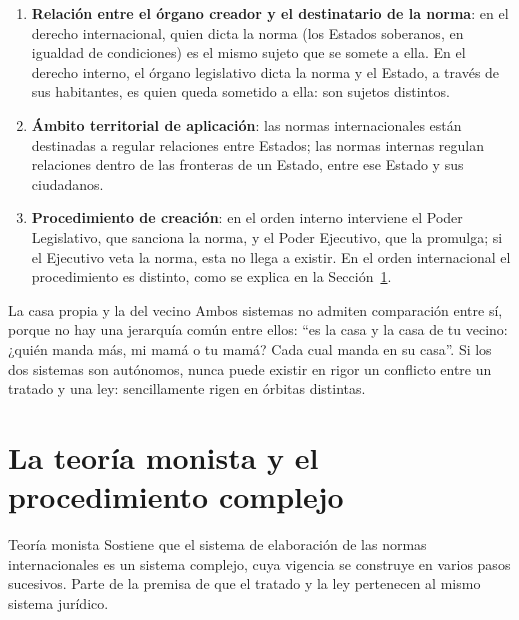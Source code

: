 \documentclass[12pt,oneside]{book}
\begin{document}
\begin{enumerate}
    \item \textbf{Relación entre el órgano creador y el destinatario de la norma}: en el derecho internacional, quien dicta la norma (los Estados soberanos, en igualdad de condiciones) es el mismo sujeto que se somete a ella. En el derecho interno, el órgano legislativo dicta la norma y el Estado, a través de sus habitantes, es quien queda sometido a ella: son sujetos distintos.
    \item \textbf{Ámbito territorial de aplicación}: las normas internacionales están destinadas a regular relaciones entre Estados; las normas internas regulan relaciones dentro de las fronteras de un Estado, entre ese Estado y sus ciudadanos.
    \item \textbf{Procedimiento de creación}: en el orden interno interviene el Poder Legislativo, que sanciona la norma, y el Poder Ejecutivo, que la promulga; si el Ejecutivo veta la norma, esta no llega a existir. En el orden internacional el procedimiento es distinto, como se explica en la Sección~\ref{sec:monismo}.
\end{enumerate}

\begin{example}{La casa propia y la del vecino}
Ambos sistemas no admiten comparación entre sí, porque no hay una jerarquía común entre ellos: “es la casa y la casa de tu vecino: ¿quién manda más, mi mamá o tu mamá? Cada cual manda en su casa”. Si los dos sistemas son autónomos, nunca puede existir en rigor un conflicto entre un tratado y una ley: sencillamente rigen en órbitas distintas.
\end{example}

\section{La teoría monista y el procedimiento complejo}\label{sec:monismo}

\begin{definition}{Teoría monista}
Sostiene que el sistema de elaboración de las normas internacionales es un sistema complejo, cuya vigencia se construye en varios pasos sucesivos. Parte de la premisa de que el tratado y la ley pertenecen al mismo sistema jurídico.
\end{definition}
\end{document}
